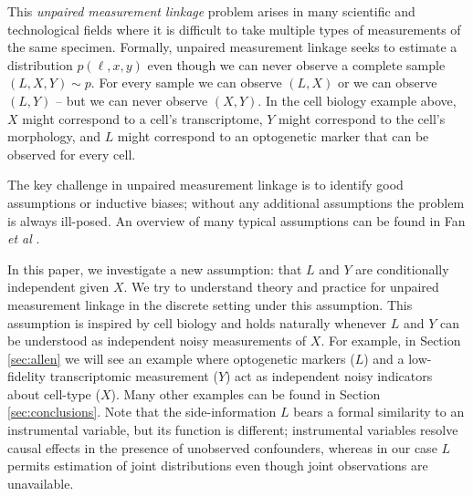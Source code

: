 \documentclass{article}
\theoremstyle{definition}
\begin{document}
This \emph{unpaired measurement linkage} problem arises in many scientific and technological fields where it is difficult to take multiple types of measurements of the same specimen.  Formally, unpaired measurement linkage seeks to estimate a distribution $p(\ell,x,y)$ even though we can never observe a complete sample $(L,X,Y)\sim p$.  For every sample we can observe $(L,X)$ or we can observe $(L,Y)$ -- but we can never observe $(X,Y)$.  In the cell biology example above, $X$ might correspond to a cell's transcriptome, $Y$ might correspond to the cell's morphology, and $L$ might correspond to an optogenetic marker that can be observed for every cell.  

The key challenge in unpaired measurement linkage is to identify good assumptions or inductive biases; without any additional assumptions the problem is always ill-posed.  An overview of many typical assumptions can be found in Fan \emph{et al} \cite{FanYan2017}.  

In this paper, we investigate a new assumption: that $L$ and $Y$ are conditionally independent given $X$.  We try to understand theory and practice for unpaired measurement linkage in the discrete setting under this assumption.  This assumption is inspired by cell biology and holds naturally whenever $L$ and $Y$ can be understood as independent noisy measurements of $X$.  For example, in Section \ref{sec:allen} we will see an example where optogenetic markers ($L$) and a low-fidelity transcriptomic measurement ($Y$) act as independent noisy indicators about cell-type ($X$).  Many other examples can be found in Section \ref{sec:conclusions}.  Note that the side-information $L$ bears a formal similarity to an instrumental variable, but its function is different; instrumental variables resolve causal effects in the presence of unobserved confounders, whereas in our case $L$ permits estimation of joint distributions even though joint observations are unavailable.  
\end{document}
